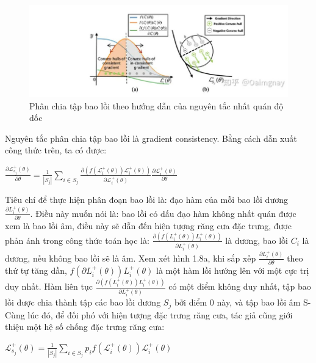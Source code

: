 \documentclass[12pt,a4paper,openany,oneside]{report}
\begin{document}
\begin{figure}[ht!]
	\begin{center}
		\includegraphics[width=445px]{./gaussian_gradient.jpg}
		\caption{Phân chia tập bao lồi theo hướng dẫn của nguyên tắc nhất quán độ dốc}
		\label{fig_dhandang1}
	\end{center}
\end{figure} 
Nguyên tắc phân chia tập bao lồi là gradient consistency. Bằng cách dẫn xuất công thức trên, ta có được:
\begin{center}
	 $\frac{\partial \mathcal{L}_{s_j}^{+}(\theta)}{\partial \theta}=\frac{1}{\left|S_j\right|} \sum_{i \in S_j} \frac{\partial\left(f\left(\mathcal{L}_i^{+}(\theta)\right) \mathcal{L}_i^{+}(\theta)\right)}{\partial \mathcal{L}_i^{+}(\theta)} \frac{\partial \mathcal{L}_i^{+}(\theta)}{\partial \theta}$
\end{center}
Tiêu chí để thực hiện phân đoạn bao lồi là: đạo hàm của mỗi bao lồi dương 
$\frac{\partial L_i^{+}(\theta)}{\partial \theta}$. Điều này muốn nói là: bao lồi có dấu đạo hàm không nhất quán được xem là bao lồi âm, điều này sẽ dẫn đến hiện tượng răng cưa đặc trưng, được phản ánh trong công thức toán học là:
$\frac{\partial\left(f\left(L_i^{+}(\theta)\right) L_i^{+}(\theta)\right)}{\partial L_i^{+}(\theta)}$ là dương, bao lồi $C_i$ là dương, nếu không bao lồi sẽ là âm. Xem xét hình 1.8a, khi sắp xếp $\frac{\partial L_i^{+}(\theta)}{\partial \theta}$ theo thứ tự tăng dần, $f\left(\partial L_i^{+}(\theta)\right) L_i^{+}(\theta)$ là một hàm lồi hướng lên với một cực trị duy nhất. Hàm liên tục $\frac{\partial\left(f\left(L_i^{+}(\theta)\right) L_i^{+}(\theta)\right)}{\partial L_i^{+}(\theta)}$ có một điểm không duy nhất, tập bao lồi được chia thành tập các bao lồi dương $S_j$ bởi điểm 0 này, và tập bao lồi âm S-
Cùng lúc đó, để đối phó với hiện tượng đặc trưng răng cưa, tác giả cũng giới thiệu một hệ số chống đặc trưng răng cưa:
\begin{center}
	$\mathcal{L}_{s_j}^{+}(\theta)=\frac{1}{\left|S_j\right|} \sum_{i \in S_j} p_i f\left(\mathcal{L}_i^{+}(\theta)\right) \mathcal{L}_i^{+}(\theta)$
\end{center}
\end{document}
